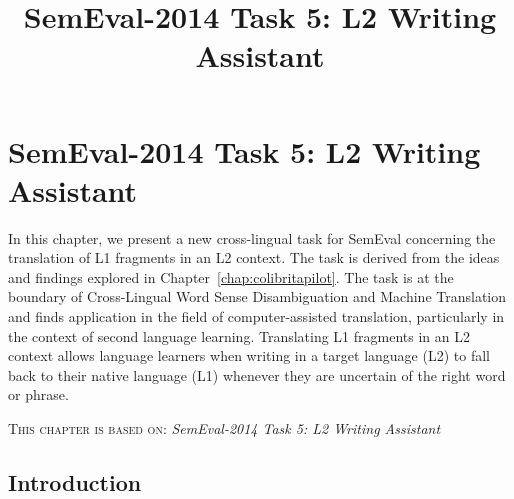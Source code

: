 \newcommand{\wsname}{SemEval-2014}
\newcommand{\submissionpage}{\url{http://alt.qcri.org/semeval2014/index.php?id=cfp}}
\newcommand{\filename}{semeval2014}
\newcommand{\contact}{pnakov qf.org.qa}

\title{SemEval-2014 Task 5: L2 Writing Assistant}
\chapter{SemEval-2014 Task 5: L2 Writing Assistant}


In this chapter, we present a new cross-lingual task for SemEval concerning the
translation of L1 fragments in an L2 context. The task is derived from the
ideas and findings explored in Chapter~\ref{chap:colibritapilot}.  The task is
at the boundary of Cross-Lingual Word Sense Disambiguation and Machine
Translation and finds application in the field of computer-assisted
translation, particularly in the context of second language learning.
Translating L1 fragments in an L2 context allows language learners when writing
in a target language (L2) to fall back to their native language (L1) whenever
they are uncertain of the right word or phrase.

\textsc{This chapter is based on: } \emph{SemEval-2014 Task 5: L2 Writing Assistant}

\section{Introduction} %
\label{intro}


